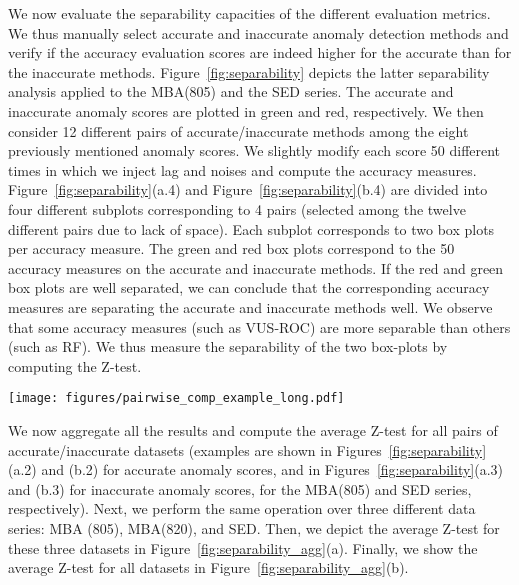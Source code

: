 We now evaluate the separability capacities of the different evaluation metrics. 
We thus manually select accurate and inaccurate anomaly detection methods and verify if the accuracy evaluation scores are indeed higher for the accurate than for the inaccurate methods. Figure~\ref{fig:separability} depicts the latter separability analysis applied to the MBA(805) and the SED series. 
The accurate and inaccurate anomaly scores are plotted in green and red, respectively. 
We then consider 12 different pairs of accurate/inaccurate methods among the eight previously mentioned anomaly scores. 
We slightly modify each score 50 different times in which we inject lag and noises and compute the accuracy measures. 
Figure~\ref{fig:separability}(a.4) and Figure~\ref{fig:separability}(b.4) are divided into four different subplots corresponding to 4 pairs (selected among the twelve different pairs due to lack of space). 
Each subplot corresponds to two box plots per accuracy measure. 
The green and red box plots correspond to the 50 accuracy measures on the accurate and inaccurate methods. 
If the red and green box plots are well separated, we can conclude that the corresponding accuracy measures are separating the accurate and inaccurate methods well. 
We observe that some accuracy measures (such as VUS-ROC) are more separable than others (such as RF). We thus measure the separability of the two box-plots by computing the Z-test. 

\begin{figure*}[tb]
  \centering
  \texttt{[image: figures/pairwise\_comp\_example\_long.pdf]}
  \caption{Separability analysis applied on 4 pairs of accurate (green) and inaccurate (red) methods on (a) the MBA(805) data series, and (b) the SED data series.}
  \label{fig:separability}
\end{figure*}

We now aggregate all the results and compute the average Z-test for all pairs of accurate/inaccurate datasets (examples are shown in Figures~\ref{fig:separability}(a.2) and (b.2) for accurate anomaly scores, and in Figures~\ref{fig:separability}(a.3) and (b.3) for inaccurate anomaly scores, for the MBA(805) and SED series, respectively). 
Next, we perform the same operation over three different data series: MBA (805), MBA(820), and SED. 
Then, we depict the average Z-test for these three datasets in Figure~\ref{fig:separability_agg}(a). 
Finally, we show the average Z-test for all datasets in Figure~\ref{fig:separability_agg}(b). 


